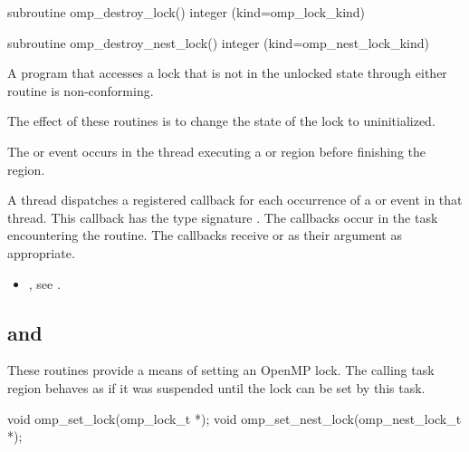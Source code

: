 \begin{fortranspecific}
\begin{ompfSubroutine}
subroutine omp_destroy_lock()
integer (kind=omp_lock_kind) 

subroutine omp_destroy_nest_lock()
integer (kind=omp_nest_lock_kind) 
\end{ompfSubroutine}
\end{fortranspecific}

\constraints
A program that accesses a lock that is not in the unlocked state through either routine is
non-conforming.

\effect
The effect of these routines is to change the state of the lock to uninitialized.

\events

The  or  event occurs in the thread
executing a  or  region
before finishing the region.

\tools

A thread dispatches a registered 
callback for each occurrence of a  or  event
in that thread.  This callback has the type signature .
The callbacks occur in the task encountering the routine.
The callbacks receive  or
  as their  argument as appropriate.


\crossreferences
\begin{itemize}
\item {}, see
.
\end{itemize}









\subsection{ and }
\label{subsec:omp_set_lock and omp_set_nest_lock}
\summary
These routines provide a means of setting an OpenMP lock. The calling
task region behaves as if it was suspended until the lock can be set
by this task.

\format
\begin{ccppspecific}
\begin{ompcFunction}
void omp_set_lock(omp_lock_t *);
void omp_set_nest_lock(omp_nest_lock_t *);
\end{ompcFunction}
\end{ccppspecific}

